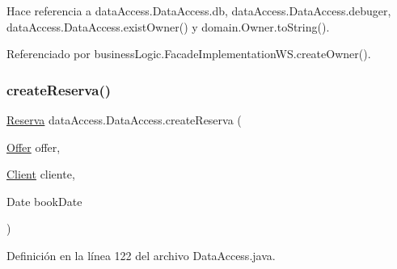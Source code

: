 Hace referencia a data\+Access.\+Data\+Access.\+db, data\+Access.\+Data\+Access.\+debuger, data\+Access.\+Data\+Access.\+exist\+Owner() y domain.\+Owner.\+to\+String().



Referenciado por business\+Logic.\+Facade\+Implementation\+W\+S.\+create\+Owner().

\mbox{\label{classdata_access_1_1_data_access_af251e5b2044f3db7d7e9e4ca687808f2}} 
\subsubsection{\texorpdfstring{createReserva()}{createReserva()}}
{\footnotesize\ttfamily \mbox{\hyperlink{classdomain_1_1_reserva}{Reserva}} data\+Access.\+Data\+Access.\+create\+Reserva (\begin{DoxyParamCaption}\item[{\mbox{\hyperlink{classdomain_1_1_offer}{Offer}}}]{offer,  }\item[{\mbox{\hyperlink{classdomain_1_1_client}{Client}}}]{cliente,  }\item[{Date}]{book\+Date }\end{DoxyParamCaption})}



Definición en la línea 122 del archivo Data\+Access.\+java.


